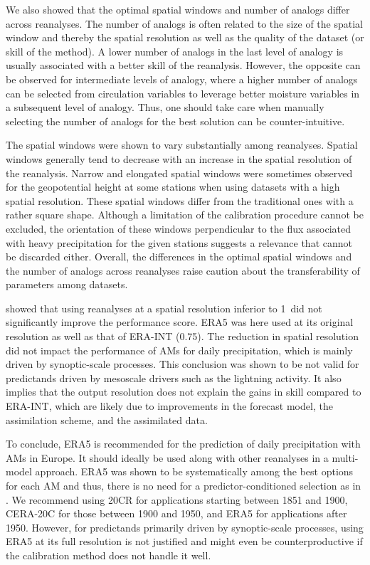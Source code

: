 \documentclass[alpha-refs]{wiley-article}
\begin{document}
We also showed that the optimal spatial windows and number of analogs differ across reanalyses. The number of analogs is often related to the size of the spatial window and thereby the spatial resolution as well as the quality of the dataset (or skill of the method). A lower number of analogs in the last level of analogy is usually associated with a better skill of the reanalysis. However, the opposite can be observed for intermediate levels of analogy, where a higher number of analogs can be selected from circulation variables to leverage better moisture variables in a subsequent level of analogy. Thus, one should take care when manually selecting the number of analogs for the best solution can be counter-intuitive.

The spatial windows were shown to vary substantially among reanalyses. Spatial windows generally tend to decrease with an increase in the spatial resolution of the reanalysis. Narrow and elongated spatial windows were sometimes observed for the geopotential height at some stations when using datasets with a high spatial resolution. These spatial windows differ from the traditional ones with a rather square shape. Although a limitation of the calibration procedure cannot be excluded, the orientation of these windows perpendicular to the flux associated with heavy precipitation for the given stations suggests a relevance that cannot be discarded either. Overall, the differences in the optimal spatial windows and the number of analogs across reanalyses raise caution about the transferability of parameters among datasets.

\citet{Horton2018b} showed that using reanalyses at a spatial resolution inferior to  1\degree\ did not significantly improve the performance score. ERA5 was here used at its original resolution as well as that of ERA-INT (0.75\degree). The reduction in spatial resolution did not impact the performance of AMs for daily precipitation, which is mainly driven by synoptic-scale processes. This conclusion was shown to be not valid for predictands driven by mesoscale drivers such as the lightning activity. It also implies that the output resolution does not explain the gains in skill compared to ERA-INT, which are likely due to improvements in the forecast model, the assimilation scheme, and the assimilated data.

To conclude, ERA5 is recommended for the prediction of daily precipitation with AMs in Europe. It should ideally be used along with other reanalyses in a multi-model approach. ERA5 was shown to be systematically among the best options for each AM and thus, there is no need for a predictor-conditioned selection as in \citet{Horton2018b}. We recommend using 20CR for applications starting between 1851 and 1900, CERA-20C for those between 1900 and 1950, and ERA5 for applications after 1950. However, for predictands primarily driven by synoptic-scale processes, using ERA5 at its full resolution is not justified and might even be counterproductive if the calibration method does not handle it well.
\end{document}
